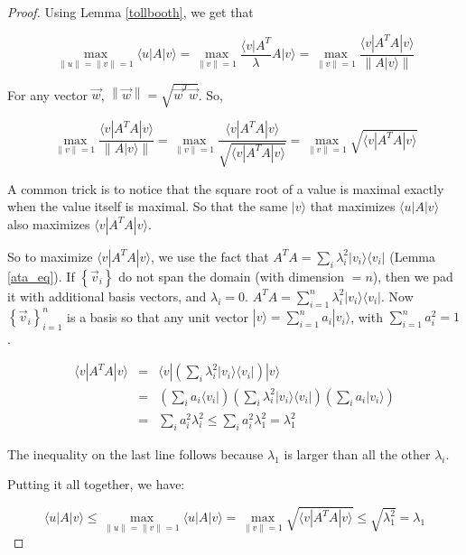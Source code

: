 \documentclass{amsbook}
\begin{document}
\begin{proof}
Using Lemma \ref{tollbooth}, we get that

$$
\max_{\|u\|=\|v\|=1}\langle u|A|v\rangle = \max_{\|v\|=1}\frac{\langle v|A^T}{\lambda}A|v\rangle = \max_{\|v\|=1} \frac{\langle v|A^TA|v\rangle}{\left\|A|v\rangle\right\|}
$$

For any vector $\vec w$, $\left\|\vec w\right\|=\sqrt{\vec w^T\vec w}$.  So,

$$
\max_{\|v\|=1} \frac{\langle v|A^TA|v\rangle}{\left\|A|v\rangle\right\|}
= \max_{\|v\|=1} \frac{\langle v|A^TA|v\rangle}{\sqrt{\langle v|A^TA|v\rangle}}
= \max_{\|v\|=1} \sqrt{\langle v|A^TA|v\rangle}
$$

A common trick is to notice that the square root of a value is maximal exactly when the value itself is maximal.  So that the same $|v\rangle$ that maximizes $\langle u|A|v\rangle$ also maximizes $\langle v|A^TA|v\rangle$.

So to maximize $\langle v|A^TA|v\rangle$, we use the fact that $A^TA=\sum_i\lambda_i^2|v_i\rangle\langle v_i|$ (Lemma \ref{ata_eq}).  If $\left\{\vec v_i\right\}$ do not span the domain (with dimension $=n$), then we pad it with additional basis vectors, and $\lambda_i=0$.  $A^TA=\sum_{i=1}^n\lambda_i^2|v_i\rangle\langle v_i|$.  Now $\left\{\vec v_i\right\}_{i=1}^n$ is a basis so that any unit vector $|v\rangle = \sum_{i=1}^na_i|v_i\rangle$, with $\sum_{i=1}^na_i^2 =1$.

\begin{equation}
\label{upperbound_eqn}
\begin{array}{rcl}
\langle v|A^TA|v\rangle &=& \langle v|\left(\sum_i\lambda_i^2|v_i\rangle\langle v_i|\right)|v\rangle \\
 &=& \left(\sum_i a_i\langle v_i|\right)\left(\sum_i\lambda_i^2|v_i\rangle\langle v_i|\right)\left(\sum_i a_i|v_i\rangle\right) \\
 &=& \sum_ia_i^2\lambda_i^2 
 \leq \sum_ia_i^2\lambda_1^2 
 = \lambda_1^2
\end{array}
\end{equation}

The inequality on the last line follows because $\lambda_1$ is larger than all the other $\lambda_i$.

Putting it all together, we have:

$$
\langle u|A|v\rangle\leq\max_{\|u\|=\|v\|=1}\langle u|A|v\rangle=\max_{\|v\|=1}\sqrt{\langle v|A^TA|v\rangle}\leq\sqrt{\lambda_1^2}=\lambda_1
$$
\end{proof}
\end{document}
